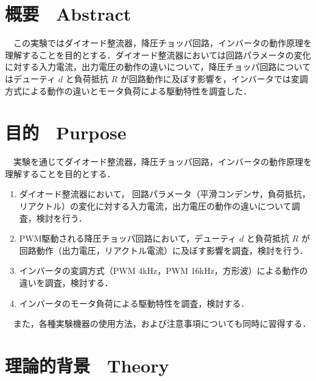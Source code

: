 




\fontsize{11.041pt}{16.562pt}\selectfont

\section{概要　Abstract}
　この実験ではダイオード整流器，降圧チョッパ回路，インバータの動作原理を理解することを目的とする．ダイオード整流器においては回路パラメータの変化に対する入力電流，出力電圧の動作の違いについて，降圧チョッパ回路についてはデューティ $d$ と負荷抵抗 $R$ が回路動作に及ぼす影響を，インバータでは変調方式による動作の違いとモータ負荷による駆動特性を調査した．

\section{目的　Purpose}
　実験を通じてダイオード整流器，降圧チョッパ回路，インバータの動作原理を理解することを目的とする．
\begin{enumerate}
    \item ダイオード整流器において， 回路パラメータ（平滑コンデンサ，負荷抵抗，リアクトル）の変化に対する入力電流，出力電圧の動作の違いについて調査，検討を行う．
    \item PWM駆動される降圧チョッパ回路において，デューティ $d$ と負荷抵抗 $R$ が回路動作（出力電圧，リアクトル電流）に及ぼす影響を調査，検討を行う．
    \item インバータの変調方式（PWM 4kHz，PWM 16kHz，方形波）による動作の違いを調査，検討する．
    \item インバータのモータ負荷による駆動特性を調査，検討する．
\end{enumerate}
　また，各種実験機器の使用方法，および注意事項についても同時に習得する．


\section{理論的背景　Theory}
